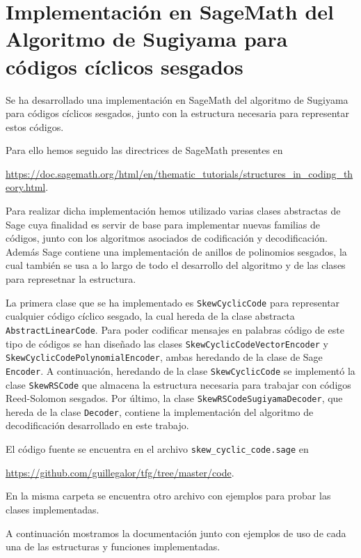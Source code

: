 \chapter{Implementación en SageMath del Algoritmo de Sugiyama para códigos cíclicos sesgados}%
\label{chap:implementación_en_sagemath_del_algoritmo_de_sugiyama_para_códigos_cíclicos_sesgados}

Se ha desarrollado una implementación en SageMath del algoritmo de Sugiyama para códigos cíclicos sesgados, junto con la estructura necesaria para representar estos códigos.

Para ello hemos seguido las directrices de SageMath presentes en
\begin{center}
\url{https://doc.sagemath.org/html/en/thematic_tutorials/structures_in_coding_theory.html}.
\end{center}
 Para realizar dicha implementación hemos utilizado varias clases abstractas de Sage cuya finalidad es servir de base para implementar nuevas familias de códigos, junto con los algoritmos asociados de codificación y decodificación. Además Sage contiene una implementación de anillos de polinomios sesgados, la cual también se usa a lo largo de todo el desarrollo del algoritmo y de las clases para represetnar la estructura.

La primera clase que se ha implementado es \texttt{SkewCyclicCode} para representar cualquier código cíclico sesgado, la cual hereda de la clase abstracta \texttt{AbstractLinearCode}. Para poder codificar mensajes en palabras código de este tipo de códigos se han diseñado las clases \texttt{SkewCyclicCodeVectorEncoder} y \texttt{SkewCyclicCodePolynomialEncoder}, ambas heredando de la clase de Sage \texttt{Encoder}. A continuación, heredando de la clase \texttt{SkewCyclicCode} se implementó la clase \texttt{SkewRSCode} que almacena la estructura necesaria para trabajar con códigos Reed-Solomon sesgados. Por último, la clase \texttt{SkewRSCodeSugiyamaDecoder}, que hereda de la clase \texttt{Decoder}, contiene la implementación del algoritmo de decodificación desarrollado en este trabajo.

El código fuente se encuentra en el archivo \texttt{skew\_cyclic\_code.sage} en
\begin{center}
\url{https://github.com/guillegalor/tfg/tree/master/code}.
\end{center}
En la misma carpeta se encuentra otro archivo con ejemplos para probar las clases implementadas.

A continuación mostramos la documentación junto con ejemplos de uso de cada una de las estructuras y funciones implementadas.

